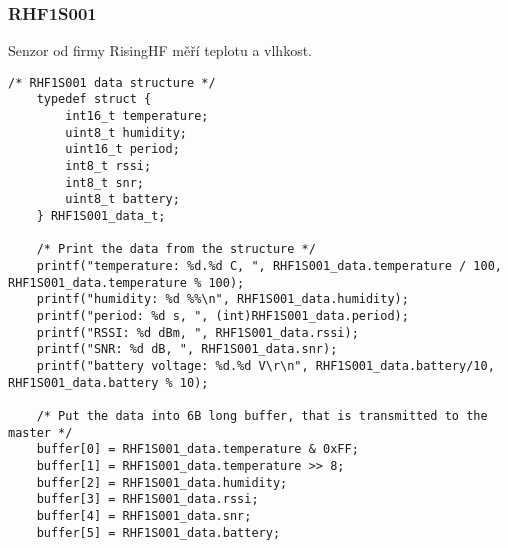 

\subsubsection{RHF1S001}
Senzor od firmy RisingHF měří teplotu a vlhkost.


\begin{lstlisting}[style=CStyle]
    /* RHF1S001 data structure */   
    typedef struct {
        int16_t temperature;
        uint8_t humidity;
        uint16_t period;
        int8_t rssi;
        int8_t snr;
        uint8_t battery;
    } RHF1S001_data_t;

    /* Print the data from the structure */
    printf("temperature: %d.%d C, ", RHF1S001_data.temperature / 100, RHF1S001_data.temperature % 100);
    printf("humidity: %d %%\n", RHF1S001_data.humidity);
    printf("period: %d s, ", (int)RHF1S001_data.period);
    printf("RSSI: %d dBm, ", RHF1S001_data.rssi);
    printf("SNR: %d dB, ", RHF1S001_data.snr);
    printf("battery voltage: %d.%d V\r\n", RHF1S001_data.battery/10, RHF1S001_data.battery % 10);

    /* Put the data into 6B long buffer, that is transmitted to the master */
    buffer[0] = RHF1S001_data.temperature & 0xFF;
    buffer[1] = RHF1S001_data.temperature >> 8;
    buffer[2] = RHF1S001_data.humidity;
    buffer[3] = RHF1S001_data.rssi;
    buffer[4] = RHF1S001_data.snr;
    buffer[5] = RHF1S001_data.battery;
\end{lstlisting}



